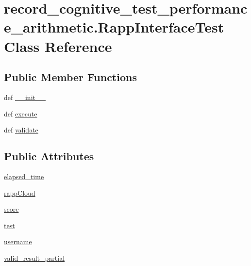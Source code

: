 \hypertarget{classrecord__cognitive__test__performance__arithmetic_1_1RappInterfaceTest}{\section{record\-\_\-cognitive\-\_\-test\-\_\-performance\-\_\-arithmetic.\-Rapp\-Interface\-Test Class Reference}
\label{classrecord__cognitive__test__performance__arithmetic_1_1RappInterfaceTest}
}
\subsection*{Public Member Functions}
\begin{DoxyCompactItemize}
\item 
def \hyperlink{classrecord__cognitive__test__performance__arithmetic_1_1RappInterfaceTest_acd45565f12094608ec9cda7b1bb26f40}{\-\_\-\-\_\-init\-\_\-\-\_\-}
\item 
def \hyperlink{classrecord__cognitive__test__performance__arithmetic_1_1RappInterfaceTest_a992998a9b3015e509a17567b8d753cf1}{execute}
\item 
def \hyperlink{classrecord__cognitive__test__performance__arithmetic_1_1RappInterfaceTest_a062d762097dda390c3776796cc98b7dd}{validate}
\end{DoxyCompactItemize}
\subsection*{Public Attributes}
\begin{DoxyCompactItemize}
\item 
\hyperlink{classrecord__cognitive__test__performance__arithmetic_1_1RappInterfaceTest_ac3c82e137896739c8ef461cb3eca222b}{elapsed\-\_\-time}
\item 
\hyperlink{classrecord__cognitive__test__performance__arithmetic_1_1RappInterfaceTest_a353e1b1ade0ec44e31ac16e3fe79bb27}{rapp\-Cloud}
\item 
\hyperlink{classrecord__cognitive__test__performance__arithmetic_1_1RappInterfaceTest_a7159092b7bb5df1274d91a4daa502fa0}{score}
\item 
\hyperlink{classrecord__cognitive__test__performance__arithmetic_1_1RappInterfaceTest_a670050956517cab203e47391cb2a56ff}{test}
\item 
\hyperlink{classrecord__cognitive__test__performance__arithmetic_1_1RappInterfaceTest_a9a6b95b2ba7b5f829f997611e0de5ce1}{username}
\item 
\hyperlink{classrecord__cognitive__test__performance__arithmetic_1_1RappInterfaceTest_a42cacb1cb721775a7dda5e95e73a2ef9}{valid\-\_\-result\-\_\-partial}
\end{DoxyCompactItemize}


